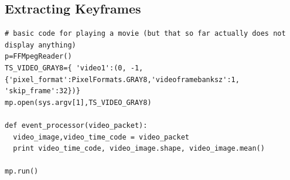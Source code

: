 \documentclass{report}
\begin{document}
\subsection{Extracting Keyframes}
\begin{lstlisting}
# basic code for playing a movie (but that so far actually does not display anything)
p=FFMpegReader()
TS_VIDEO_GRAY8={ 'video1':(0, -1, {'pixel_format':PixelFormats.GRAY8,'videoframebanksz':1, 'skip_frame':32})}
mp.open(sys.argv[1],TS_VIDEO_GRAY8)

def event_processor(video_packet):
  video_image,video_time_code = video_packet
  print video_time_code, video_image.shape, video_image.mean()

mp.run()

\end{lstlisting}
\end{document}
